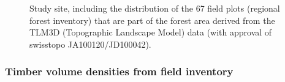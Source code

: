 \begin{figure}[H]
	\centering
	\caption{Study site, including the distribution of the 67 field plots (regional forest inventory) that are part of the forest area derived from the TLM3D (Topographic Landscape Model) data (with approval of swisstopo JA100120/JD100042).}
	\label{fig:StudyArea}
\end{figure}


\subsubsection{Timber volume densities from field inventory}
\label{sec:tvolvar}

